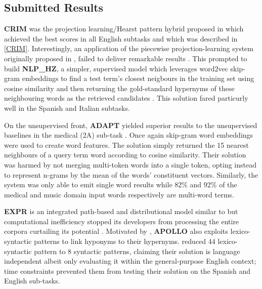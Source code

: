 \subsection{Submitted Results}
\textbf{CRIM} was the projection learning/Hearst pattern hybrid proposed in \citep{bernier2018crim} which achieved the best scores in all English subtasks and which was described in \cref{CRIM}.  Interestingly, an application of the piecewise projection-learning system originally proposed in \citep{Fu2014}, failed to deliver remarkable results \citep{qiu2018nlp_hz}.  This prompted \citeauthor{qiu2018nlp_hz} to build \textbf{NLP\_HZ}, a simpler, supervised model which leverages word2vec skip-gram embeddings \citep{mikolov2013efficient} to find a test term's closest neigbours in the training set using cosine similarity and then returning the gold-standard hypernyms of these neighbouring words as the retrieved candidates \citep{qiu2018nlp_hz}.  This solution  fared particurly well in the Spanish and Italian subtasks.

On the unsupervised front, \textbf{ADAPT} yielded superior results to the unsupervised baselines in the medical (2A) sub-task \citep{maldonado2018adapt}.  Once again skip-gram word embeddings \citep{mikolov2013efficient} were used to create word features.  The solution simply returned the 15 nearest neighbours of a query term word according to cosine similarity.  Their solution was harmed by not merging multi-token words into a single token, opting instead to represent n-grams by the mean of the words' constituent vectors.  Similarly, the system was only able to emit single word results while 82\% and 92\% of the medical and music domain input words respectively are multi-word terms.

\textbf{EXPR} is an integrated path-based and distributional model similar to \citep{shwartz2016path} but computational inefficiency stopped its developers from processing the entire corpora curtailing its potential \citep{aldine2018expr}.  Motivated by \citep{hearst1992automatic, Snow2004}, \textbf{APOLLO} also exploits lexico-syntactic patterns to link hyponyms to their hypernyms.  \citeauthor{onofrei2018apollo} reduced 44 lexico-syntactic pattern to 8 syntactic patterns,  claiming their solution is language independent albeit only evaluating it within the general-purpose English context; time constraints prevented them from testing their solution on the Spanish and English sub-tasks.

